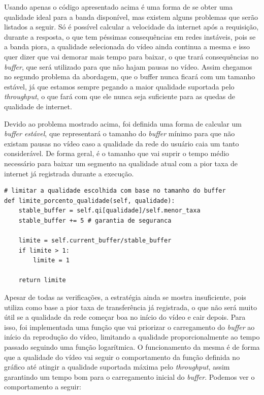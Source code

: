 \documentclass[12pt]{article}
\begin{document}
Usando apenas o código apresentado acima é uma forma de se obter uma qualidade ideal para a banda disponível, mas existem alguns problemas que serão listados a seguir. Só é possível calcular a velocidade da internet após a requisição, durante a resposta, o que tem péssimas consequências em redes instáveis, pois se a banda piora, a qualidade selecionada do vídeo ainda continua a mesma e isso quer dizer que vai demorar mais tempo para baixar, o que trará consequências no \textit{buffer}, que será utilizado para que não hajam pausas no vídeo. Assim chegamos no segundo problema da abordagem, que o buffer nunca ficará com um tamanho estável, já que estamos sempre pegando a maior qualidade suportada pelo \textit{throughput}, o que fará com que ele nunca seja suficiente para as quedas de qualidade de internet.

Devido ao problema mostrado acima, foi definida uma forma de calcular um \textit{buffer estável}, que representará o tamanho do \textit{buffer} mínimo para que não existam pausas no vídeo caso a qualidade da rede do usuário caia um tanto considerável. De forma geral, é o tamanho que vai suprir o tempo médio necessário para baixar um segmento na qualidade atual com a pior taxa de internet já registrada durante a execução.

\begin{lstlisting}
# limitar a qualidade escolhida com base no tamanho do buffer
def limite_porcento_qualidade(self, qualidade):
    stable_buffer = self.qi[qualidade]/self.menor_taxa
    stable_buffer += 5 # garantia de seguranca

    limite = self.current_buffer/stable_buffer
    if limite > 1:
        limite = 1

    return limite
\end{lstlisting}

Apesar de todas as verificações, a estratégia ainda se mostra insuficiente, pois utiliza como base a pior taxa de transferência já registrada, o que não será muito útil se a qualidade da rede começar boa no início do vídeo e cair depois. Para isso, foi implementada uma função que vai priorizar o carregamento do \textit{buffer} ao início da reprodução do vídeo, limitando a qualidade proporcionalmente ao tempo passado seguindo uma função logarítmica. O funcionamento da mesma é de forma que a qualidade do vídeo vai seguir o comportamento da função definida no gráfico até atingir a qualidade suportada máxima pelo \textit{throughput}, assim garantindo um tempo bom para o carregamento inicial do \textit{buffer}. Podemos ver o comportamento a seguir:
\end{document}
